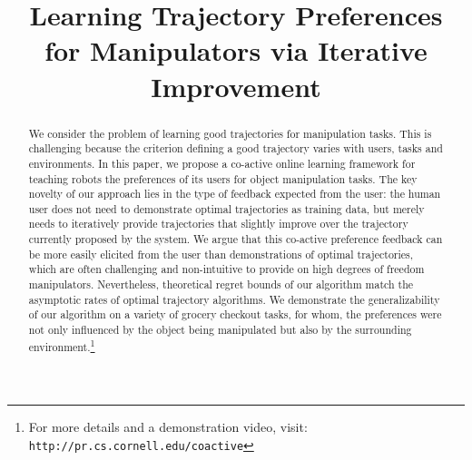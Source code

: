 \title{Learning Trajectory Preferences for Manipulators via Iterative Improvement}

\begin{abstract}
We consider the problem of learning good trajectories for manipulation tasks. This is challenging because the criterion defining a good trajectory varies with users, tasks and environments.  In this paper, we propose a co-active online learning framework for teaching robots the preferences of its users for object manipulation tasks. The key novelty of our approach lies in the type of feedback expected from the user: the human user does not need to demonstrate optimal trajectories as training data, but merely needs to iteratively provide trajectories that slightly improve over the trajectory currently proposed by the system. We argue that this co-active preference feedback can be more easily elicited from the user than demonstrations of optimal trajectories, which are often challenging and non-intuitive to provide on high degrees of freedom manipulators. Nevertheless, theoretical regret bounds of our algorithm match the asymptotic rates of optimal trajectory algorithms. We demonstrate the generalizability of our algorithm on a variety of grocery checkout tasks, for whom, the preferences were not only influenced by the object being manipulated but also by the surrounding environment.\footnote{For more details and a demonstration video, visit: \texttt{http://pr.cs.cornell.edu/coactive}}

\end{abstract}

